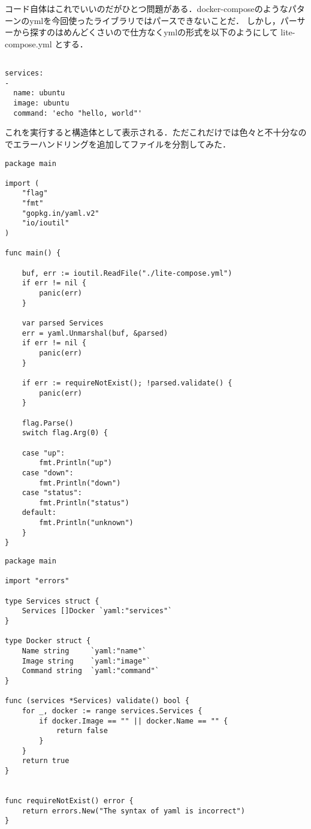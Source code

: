 コード自体はこれでいいのだがひとつ問題がある．docker-composeのようなパターンのymlを今回使ったライブラリではパースできないことだ．
しかし，パーサーから探すのはめんどくさいので仕方なくymlの形式を以下のようにして lite-compose.yml とする．

\begin{verbatim}

services:
-
  name: ubuntu
  image: ubuntu
  command: 'echo "hello, world"'

\end{verbatim}

これを実行すると構造体として表示される．ただこれだけでは色々と不十分なのでエラーハンドリングを追加してファイルを分割してみた．

\begin{verbatim}
package main

import (
    "flag"
    "fmt"
    "gopkg.in/yaml.v2"
    "io/ioutil"
)

func main() {

    buf, err := ioutil.ReadFile("./lite-compose.yml")
    if err != nil {
        panic(err)
    }

    var parsed Services
    err = yaml.Unmarshal(buf, &parsed)
    if err != nil {
        panic(err)
    }

    if err := requireNotExist(); !parsed.validate() {
        panic(err)
    }

    flag.Parse()
    switch flag.Arg(0) {

    case "up":
        fmt.Println("up")
    case "down":
        fmt.Println("down")
    case "status":
        fmt.Println("status")
    default:
        fmt.Println("unknown")
    }
}
\end{verbatim}

\begin{verbatim}
package main

import "errors"

type Services struct {
    Services []Docker `yaml:"services"`
}

type Docker struct {
    Name string     `yaml:"name"`
    Image string    `yaml:"image"`
    Command string  `yaml:"command"`
}

func (services *Services) validate() bool {
    for _, docker := range services.Services {
        if docker.Image == "" || docker.Name == "" {
            return false
        }
    }
    return true
}


func requireNotExist() error {
    return errors.New("The syntax of yaml is incorrect")
}
\end{verbatim}


